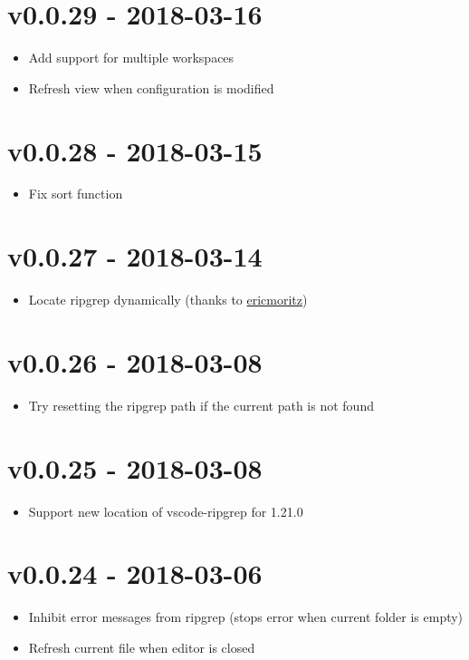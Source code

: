 \chapter{v0.0.29 - 2018-03-16}
\begin{itemize}
\item{Add support for multiple workspaces}
\item{Refresh view when configuration is modified}
\end{itemize}

\chapter{v0.0.28 - 2018-03-15}
\begin{itemize}
\item{Fix sort function}
\end{itemize}

\chapter{v0.0.27 - 2018-03-14}
\begin{itemize}
\item{Locate ripgrep dynamically (thanks to \href{https://github.com/ericmoritz}{ericmoritz})}
\end{itemize}

\chapter{v0.0.26 - 2018-03-08}
\begin{itemize}
\item{Try resetting the ripgrep path if the current path is not found}
\end{itemize}

\chapter{v0.0.25 - 2018-03-08}
\begin{itemize}
\item{Support new location of vscode-ripgrep for 1.21.0}
\end{itemize}

\chapter{v0.0.24 - 2018-03-06}
\begin{itemize}
\item{Inhibit error messages from ripgrep (stops error when current folder is empty)}
\item{Refresh current file when editor is closed}
\end{itemize}

